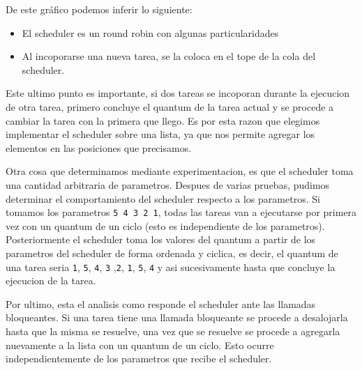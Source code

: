De este gráfico podemos inferir lo siguiente:

\begin{itemize}
	\item El scheduler es un round robin con algunas particularidades
	\item Al incoporarse una nueva tarea, se la coloca en el tope de la cola del scheduler.
\end{itemize}

Este ultimo punto es importante, si dos tareas se incoporan durante la ejecucion de otra tarea, primero concluye el quantum de la tarea actual y se procede a cambiar la tarea con la primera que llego. Es por esta razon que elegimos implementar el scheduler sobre una lista, ya que nos permite agregar los elementos en las posiciones que precisamos.

Otra cosa que determinamos mediante experimentacion, es que el scheduler toma una cantidad arbitraria de parametros. Despues de varias pruebas, pudimos determinar el comportamiento del scheduler respecto a los parametros. Si tomamos los parametros \texttt{5 4 3 2 1}, todas las tareas van a ejecutarse por primera vez con un quantum de un ciclo (esto es independiente de los parametros). Posteriormente el scheduler toma los valores del quantum a partir de los parametros del scheduler de forma ordenada y ciclica, es decir, el quantum de una tarea seria \texttt{1}, \texttt{5}, \texttt{4}, \texttt{3} ,\texttt{2}, \texttt{1}, \texttt{5}, \texttt{4} y asi sucesivamente hasta que concluye la ejecucion de la tarea.

Por ultimo, esta el analisis como responde el scheduler ante las llamadas bloqueantes. Si una tarea tiene una llamada bloqueante se procede a desalojarla hasta que la misma se resuelve, una vez que se resuelve se procede a agregarla nuevamente a la lista con un quantum de un ciclo. Esto ocurre independientemente de los parametros que recibe el scheduler.